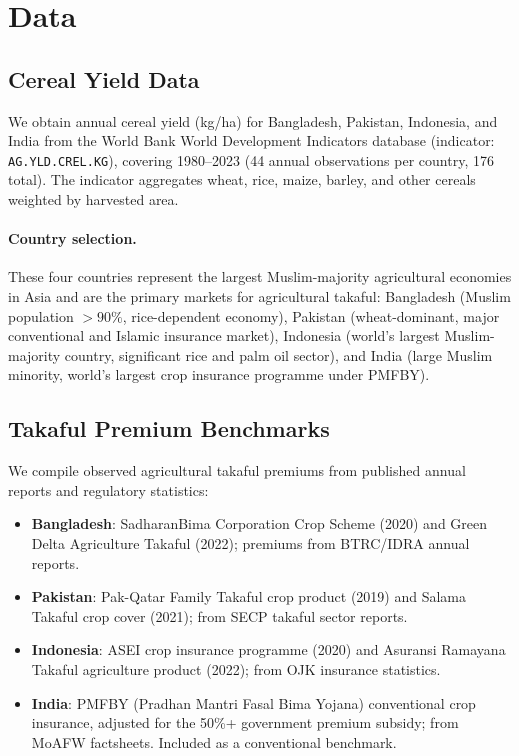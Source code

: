 \documentclass[12pt,a4paper]{article}
\begin{document}
\section{Data}
\label{sec:data}

\subsection{Cereal Yield Data}

We obtain annual cereal yield (kg/ha) for Bangladesh, Pakistan, Indonesia, and India
from the World Bank World Development Indicators database
(indicator: \texttt{AG.YLD.CREL.KG}), covering 1980--2023 (44 annual observations
per country, 176 total).
The indicator aggregates wheat, rice, maize, barley, and other cereals weighted by
harvested area.

\paragraph{Country selection.}
These four countries represent the largest Muslim-majority agricultural economies in
Asia and are the primary markets for agricultural takaful:
Bangladesh (Muslim population $>90\%$, rice-dependent economy),
Pakistan (wheat-dominant, major conventional and Islamic insurance market),
Indonesia (world's largest Muslim-majority country, significant rice and palm oil sector),
and India (large Muslim minority, world's largest crop insurance programme under PMFBY).

\subsection{Takaful Premium Benchmarks}

We compile observed agricultural takaful premiums from published annual reports and
regulatory statistics:
\begin{itemize}
  \item \textbf{Bangladesh}: SadharanBima Corporation Crop Scheme (2020) and Green Delta
    Agriculture Takaful (2022); premiums from BTRC/IDRA annual reports.
  \item \textbf{Pakistan}: Pak-Qatar Family Takaful crop product (2019) and Salama
    Takaful crop cover (2021); from SECP takaful sector reports.
  \item \textbf{Indonesia}: ASEI crop insurance programme (2020) and Asuransi Ramayana
    Takaful agriculture product (2022); from OJK insurance statistics.
  \item \textbf{India}: PMFBY (Pradhan Mantri Fasal Bima Yojana) conventional crop
    insurance, adjusted for the 50\%+ government premium subsidy; from MoAFW
    factsheets. Included as a conventional benchmark.
\end{itemize}
\end{document}

